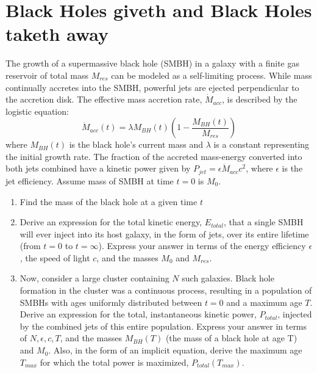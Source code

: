 \documentclass{article}
\begin{document}
\section{Black Holes giveth and Black Holes taketh away}
The growth of a supermassive black hole (SMBH) in a galaxy with a finite gas reservoir of total mass $M_{res}$ can be modeled as a self-limiting process. While mass continually accretes into the SMBH, powerful jets are ejected perpendicular to the accretion disk. The effective mass accretion rate, $\dot{M}_{acc}$, is described by the logistic equation:
\[
\dot{M}_{acc}(t) = \lambda M_{BH}(t) \left(1 - \frac{M_{BH}(t)}{M_{res}}\right)
\]
where $M_{BH}(t)$ is the black hole's current mass and $\lambda$ is a constant representing the initial growth rate. The fraction of the accreted mass-energy converted into both jets combined have a kinetic power given by $P_{jet} = \epsilon \dot{M}_{acc} c^2$, where $\epsilon$ is the jet efficiency. Assume mass of SMBH at time $t=0$ is $M_0$.

\begin{enumerate}
    \item Find the mass of the black hole at a given time $t$
    \item Derive an expression for the total kinetic energy, $E_{total}$, that a single SMBH will ever inject into its host galaxy, in the form of jets, over its entire lifetime (from $t=0$ to $t=\infty$). Express your answer in terms of the energy efficiency $\epsilon$, the speed of light $c$, and the masses $M_0$ and $M_{res}$.

    \vspace{1em}

    \item Now, consider a large cluster containing $N$ such galaxies. Black hole formation in the cluster was a continuous process, resulting in a population of SMBHs with ages uniformly distributed between $t=0$ and a maximum age $T$. Derive an expression for the total, instantaneous kinetic power, $P_{total}$, injected by the combined jets of this entire population. Express your answer in terms of $N, \epsilon, c, T$, and the masses $M_{BH}(T)$ (the mass of a black hole at age T) and $M_0$. Also, in the form of an implicit equation, derive the maximum age $T_{max}$ for which the total power is maximized, $P_{total}(T_{max})$.
\end{enumerate}
\end{document}
